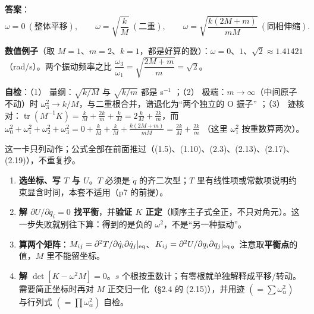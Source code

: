\documentclass[11pt]{ctexart}
\begin{document}
\textbf{答案}：
\[
\omega=0\ (\text{整体平移}),\qquad \omega=\sqrt{\frac{k}{M}}\ (\text{二重}),\qquad \omega=\sqrt{\frac{k(2M+m)}{mM}}\ (\text{同相伸缩}).
\tag{5.6}
\]

\textbf{数值例子}（取 $M=1$、$m=2$、$k=1$，都是好算的数）：$\omega=0$、$1$、$\sqrt2\approx1.41421$（rad/s）。两个振动频率之比 $\dfrac{\omega_3}{\omega_1}=\sqrt{\dfrac{2M+m}{m}}=\sqrt2$。


\textbf{自检}：（1） 量纲：$\sqrt{k/M}$ 与 $\sqrt{k/m}$ 都是 s$^{-1}$ \checkmark；（2） 极端：$m\to\infty$（中间原子不动）时 $\omega_3^2\to k/M$，与二重根合并，谱退化为“两个独立的 O 振子” \checkmark；（3） 迹核对：$\operatorname{tr}(M^{-1}K)=\frac{k}{M}+\frac{2k}{m}+\frac{k}{M}=2\frac kM+\frac{2k}{m}$，而 $\omega_0^2+\omega_1^2+\omega_2^2+\omega_3^2=0+\frac kM+\frac kM+\frac{k(2M+m)}{mM}=\frac{2k}{M}+\frac{2k}{m}$ \checkmark（这里 $\omega_1^2$ 按重数算两次）。

\flowerrule


这一卡只列动作；公式全部在前面推过（(1.5)、(1.10)、(2.3)、(2.13)、(2.17)、(2.19)），不重复抄。

\begin{enumerate}
\item \textbf{选坐标、写 $T$ 与 $U$}。$T$ 必须是 $\dot q$ 的齐二次型；$T$ 里有线性项或常数项说明约束显含时间，本套不适用（p7 的前提）。
\item \textbf{解 $\partial U/\partial q_i=0$ 找平衡}，并\textbf{验证 $K$ 正定}（顺序主子式全正，不只对角元）。这一步失败就别往下算：得到的是负的 $\omega^2$，不是“另一种振动”。
\item \textbf{算两个矩阵}：$M_{ij}=\partial^2T/\partial\dot q_i\partial\dot q_j|_{\rm eq}$、$K_{ij}=\partial^2U/\partial q_i\partial q_j|_{\rm eq}$。注意取\textbf{平衡点}的值，$M$ 里不能留坐标。
\item \textbf{解 $\det[K-\omega^2M]=0$}。$s$ 个根按重数计；有零根就单独解释成平移/转动。需要简正坐标时再对 $M$ 正交归一化（§2.4 的 (2.15)），并用迹 $(=\sum\omega_\alpha^2)$ 与行列式 $(=\prod\omega_\alpha^2)$ 自检。
\end{enumerate}
\end{document}
